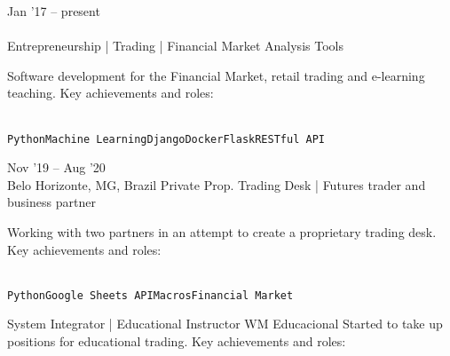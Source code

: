 \documentclass[10pt]{developercv} %
\begin{document}


\begin{entrylist}
  \entry
  {Jan '17 -- present\\\footnotesize{}\\\footnotesize{}}
  {Entrepreneurship | Trading | Financial Market Analysis Tools}
  {}
  {Software development for the Financial Market, retail trading and e-learning teaching. Key achievements and roles:\\
    \begin{contributionlist}
    \end{contributionlist}\\
    \texttt{Python}\slashsep\texttt{Machine Learning}\slashsep\texttt{Django}\slashsep\texttt{Docker}\slashsep\texttt{Flask}\slashsep\texttt{RESTful API}}
  \entry
  {Nov '19 -- Aug '20\\\footnotesize{Belo Horizonte, MG, Brazil}}
  {Private Prop. Trading Desk | Futures trader and business partner}
  {}
  {Working with two partners in an attempt to create a proprietary trading desk. Key achievements and roles:\\
    \begin{contributionlist}
    \end{contributionlist}\\
    \texttt{Python}\slashsep\texttt{Google Sheets API}\slashsep\texttt{Macros}\slashsep\texttt{Financial Market}}
  {System Integrator | Educational Instructor}
  {WM Educacional}
  {
    Started to take up positions for educational trading. Key achievements and roles:\\
}
\end{entrylist}
\end{document}
